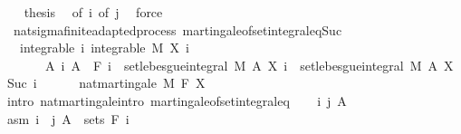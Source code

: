 \begin{isabellebody}
\ \ \isamarkupfalse%
\ {\isacharquery}{\kern0pt}thesis\ \isamarkupfalse%
\ {\isacharasterisk}{\kern0pt}{\isacharbrackleft}{\kern0pt}of\ i{\isacharbrackright}{\kern0pt}\ {\isacharasterisk}{\kern0pt}{\isacharbrackleft}{\kern0pt}of\ j{\isacharbrackright}{\kern0pt}\ \isamarkupfalse%
\ force\isanewline
{}\isamarkupfalse%
%
\endisatagproof
{\isafoldproof}%
%
\isadelimproof
\isanewline
%
\endisadelimproof
\isanewline
{}\isamarkupfalse%
\ {\isacharparenleft}{\kern0pt}\ nat{\isacharunderscore}{\kern0pt}sigma{\isacharunderscore}{\kern0pt}finite{\isacharunderscore}{\kern0pt}adapted{\isacharunderscore}{\kern0pt}process{\isacharparenright}{\kern0pt}\ martingale{\isacharunderscore}{\kern0pt}of{\isacharunderscore}{\kern0pt}set{\isacharunderscore}{\kern0pt}integral{\isacharunderscore}{\kern0pt}eq{\isacharunderscore}{\kern0pt}Suc{\isacharcolon}{\kern0pt}\isanewline
\ \ \ integrable{\isacharcolon}{\kern0pt}\ {\isachardoublequoteopen}{\isasymAnd}i{\isachardot}{\kern0pt}\ integrable\ M\ {\isacharparenleft}{\kern0pt}X\ i{\isacharparenright}{\kern0pt}{\isachardoublequoteclose}\isanewline
\ \ \ \ \ \ \ {\isachardoublequoteopen}{\isasymAnd}A\ i{\isachardot}{\kern0pt}\ A\ {\isasymin}\ F\ i\ {\isasymLongrightarrow}\ set{\isacharunderscore}{\kern0pt}lebesgue{\isacharunderscore}{\kern0pt}integral\ M\ A\ {\isacharparenleft}{\kern0pt}X\ i{\isacharparenright}{\kern0pt}\ {\isacharequal}{\kern0pt}\ set{\isacharunderscore}{\kern0pt}lebesgue{\isacharunderscore}{\kern0pt}integral\ M\ A\ {\isacharparenleft}{\kern0pt}X\ {\isacharparenleft}{\kern0pt}Suc\ i{\isacharparenright}{\kern0pt}{\isacharparenright}{\kern0pt}{\isachardoublequoteclose}\ \isanewline
\ \ \ \ \ {\isachardoublequoteopen}nat{\isacharunderscore}{\kern0pt}martingale\ M\ F\ X{\isachardoublequoteclose}\isanewline
%
\isadelimproof
%
\endisadelimproof
%
\isatagproof
{}\isamarkupfalse%
\ {\isacharparenleft}{\kern0pt}intro\ nat{\isacharunderscore}{\kern0pt}martingale{\isachardot}{\kern0pt}intro\ martingale{\isacharunderscore}{\kern0pt}of{\isacharunderscore}{\kern0pt}set{\isacharunderscore}{\kern0pt}integral{\isacharunderscore}{\kern0pt}eq{\isacharparenright}{\kern0pt}\isanewline
\ \ \isamarkupfalse%
\ i\ j\ A\ \isamarkupfalse%
\ asm{\isacharcolon}{\kern0pt}\ {\isachardoublequoteopen}i\ {\isasymle}\ j{\isachardoublequoteclose}\ {\isachardoublequoteopen}A\ {\isasymin}\ sets\ {\isacharparenleft}{\kern0pt}F\ i{\isacharparenright}{\kern0pt}{\isachardoublequoteclose}\isanewline

\end{isabellebody}
